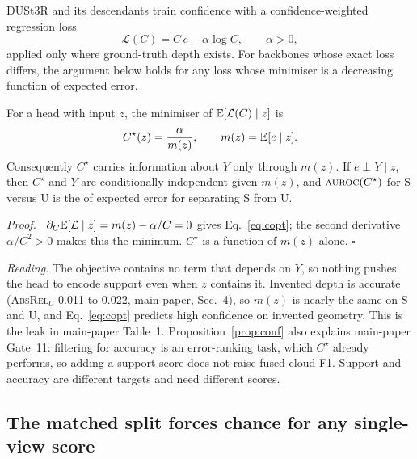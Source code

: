 DUSt3R and its descendants train confidence with a confidence-weighted
regression loss~\cite{wang2024dust3r}
\begin{equation}
  \mathcal{L}(C)=C\,e-\alpha\log C,\qquad \alpha>0,
  \label{eq:confloss}
\end{equation}
applied only where ground-truth depth exists. For backbones whose exact loss
differs, the argument below holds for any loss whose minimiser is a
decreasing function of expected error.

\begin{proposition}\label{prop:conf}
For a head with input $z$, the minimiser of $\mathbb{E}[\mathcal{L}(C)\mid z]$ is
\begin{equation}
  C^\star(z)=\frac{\alpha}{m(z)},\qquad m(z)=\mathbb{E}[e\mid z].
  \label{eq:copt}
\end{equation}
Consequently $C^\star$ carries information about $Y$ only through $m(z)$.
If $e\perp Y\mid z$, then $C^\star$ and $Y$ are conditionally independent
given $m(z)$, and $\textsc{auroc}(C^\star)$ for S versus U is the \auroc{} of expected
error for separating S from U.
\end{proposition}
\par\noindent\emph{Proof.}~
$\partial_C\mathbb{E}[\mathcal{L}\mid z]=m(z)-\alpha/C=0$ gives Eq.~\eqref{eq:copt};
the second derivative $\alpha/C^2>0$ makes this the minimum. $C^\star$ is a
function of $m(z)$ alone.
\hfill$\square$\par

\noindent\emph{Reading.} The objective contains no term that depends on $Y$, so
nothing pushes the head to encode support even when $z$ contains it. Invented
depth is accurate (\textsc{AbsRel}$_U$ 0.011 to 0.022, main paper, Sec.~4), so
$m(z)$ is nearly the same on S and U, and Eq.~\eqref{eq:copt} predicts high
confidence on invented geometry. This is the leak in main-paper Table~1.
Proposition~\ref{prop:conf} also explains main-paper Gate~11: filtering for
accuracy is an error-ranking task, which $C^\star$ already performs, so adding
a support score does not raise fused-cloud F1. Support and accuracy are
different targets and need different scores.

\subsection{The matched split forces chance for any single-view score}

